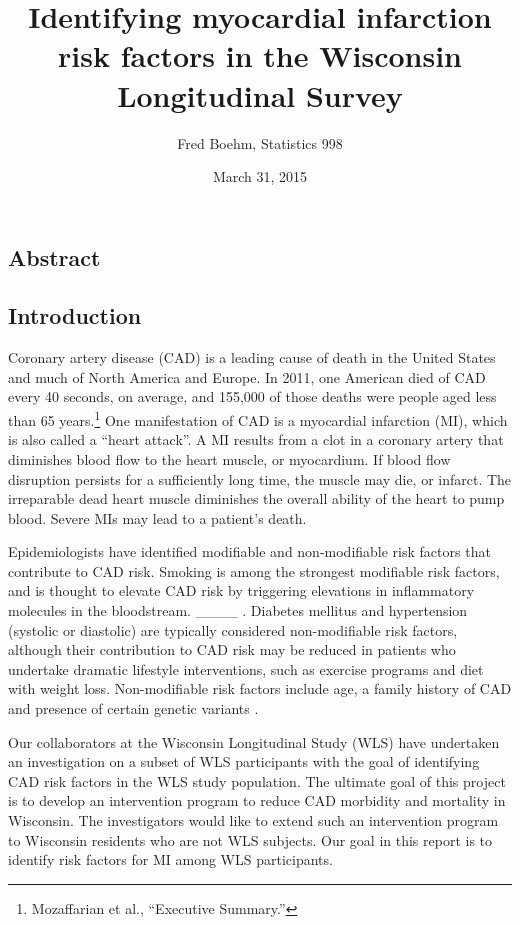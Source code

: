 \documentclass[11pt,]{article}
\title{Identifying myocardial infarction risk factors in the Wisconsin
Longitudinal Survey}
\author{Fred Boehm, Statistics 998}
\date{March 31, 2015}
\let\rmarkdownfootnote\footnote%
\def\footnote{\protect\rmarkdownfootnote}
\begin{document}
\maketitle


\listoftodos

\subsection{Abstract}\label{abstract}

\subsection{Introduction}\label{introduction}

Coronary artery disease (CAD) is a leading cause of death in the United
States and much of North America and Europe. In 2011, one American died
of CAD every 40 seconds, on average, and 155,000 of those deaths were
people aged less than 65 years.\footnote{Mozaffarian et al., ``Executive
  Summary.'' } One manifestation of CAD is a myocardial infarction (MI),
which is also called a ``heart attack''. A MI results from a clot in a
coronary artery that diminishes blood flow to the heart muscle, or
myocardium. If blood flow disruption persists for a sufficiently long
time, the muscle may die, or infarct. The irreparable dead heart muscle
diminishes the overall ability of the heart to pump blood. Severe MIs
may lead to a patient's death.

Epidemiologists have identified modifiable and non-modifiable risk
factors that contribute to CAD risk. Smoking is among the strongest
modifiable risk factors, and is thought to elevate CAD risk by
triggering elevations in inflammatory molecules in the bloodstream.
\_\_\_\_
.
Diabetes mellitus and hypertension (systolic or diastolic) are typically
considered non-modifiable risk factors, although their contribution to
CAD risk may be reduced in patients who undertake dramatic lifestyle
interventions, such as exercise programs and diet with weight loss.
Non-modifiable risk factors include age, a family history of CAD and
presence of certain genetic variants
.

Our collaborators at the Wisconsin Longitudinal Study (WLS) have
undertaken an investigation on a subset of WLS participants with the
goal of identifying CAD risk factors in the WLS study population. The
ultimate goal of this project is to develop an intervention program to
reduce CAD morbidity and mortality in Wisconsin. The investigators would
like to extend such an intervention program to Wisconsin residents who
are not WLS subjects. Our goal in this report is to identify risk
factors for MI among WLS participants.
\end{document}
